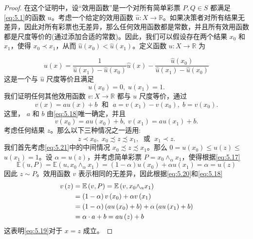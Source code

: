 \begin{proof}
在这个证明中，设“效用函数”是一个对所有简单彩票 \(P,Q \in  S\) 都满足\eqref{eq:5.1}的函数 \(u\)。考虑一个给定的效用函数 \(\widehat{u} : X \rightarrow  \mathbb{R}\)。如果决策者对所有结果无差异，因此对所有彩票也无差异，那么任何效用函数都是常数，并且所有效用函数都是尺度等价的(通过添加合适的常数)。因此，我们可以假设存在两个结果 \({x}_{0}\) 和 \({x}_{1}\)，使得 \({x}_{0} \prec  {x}_{1}\)，从而 \(\widehat{u}\left( {x}_{0}\right)  < \widehat{u}\left( {x}_{1}\right)\)。定义函数 \(u : X \rightarrow  \mathbb{R}\) 为

\[
u\left( x\right)  = \frac{1}{\widehat{u}\left( {x}_{1}\right)  - \widehat{u}\left( {x}_{0}\right) }\widehat{u}\left( x\right)  - \frac{\widehat{u}\left( {x}_{0}\right) }{\widehat{u}\left( {x}_{1}\right)  - \widehat{u}\left( {x}_{0}\right) }
\]
这是一个与 \(\widehat{u}\) 尺度等价且满足
\begin{equation}
\label{eq:5.18}
u\left( {x}_{0}\right)  = 0,\;u\left( {x}_{1}\right)  = 1.
\end{equation}
我们证明任何其他效用函数 \(v : X \rightarrow  \mathbb{R}\) 都与 \(u\) 尺度等价，通过
\begin{equation}
\label{eq:5.19}
v\left( x\right)  = {au}\left( x\right)  + b\;\text{ 和 }\;a = v\left( {x}_{1}\right)  - v\left( {x}_{0}\right) ,\;b = v\left( {x}_{0}\right) .
\end{equation}
这里， \(a\) 和 \(b\) 由\eqref{eq:5.18}唯一确定，并且
\begin{equation}
\label{eq:5.20}
v\left( {x}_{0}\right)  = {au}\left( {x}_{0}\right)  + b,\;v\left( {x}_{1}\right)  = {au}\left( {x}_{1}\right)  + b.
\end{equation}
考虑任何结果 \(z\)。那么以下三种情况之一适用:
\begin{equation}
\label{eq:5.21}
z \prec  {x}_{0},\;{x}_{0} \precsim  z \precsim  {x}_{1},\;\text{ 或 }\;{x}_{1} \prec  z.
\end{equation}
我们首先考虑\eqref{eq:5.21}中的中间情况 \({x}_{0} \precsim  z \precsim  {x}_{1}\)。那么 \(0 = u\left( {x}_{0}\right)  \leq  u\left( z\right)  \leq\)  \(u\left( {x}_{1}\right)  = 1\)。设 \(\alpha  = u\left( z\right)\)，并考虑简单彩票 \(P = {x}_{0}{ \land  }_{\alpha }{x}_{1}\)，使得根据\eqref{eq:5.17}
\[
\mathbb{E}\left( {u,P}\right)  = \mathbb{E}\left( {u,{x}_{0}{ \land  }_{\alpha }{x}_{1}}\right)  = \left( {1 - \alpha }\right) u\left( {x}_{0}\right)  + {\alpha u}\left( {x}_{1}\right)  = \alpha  = u\left( z\right)
\]
因此 \(z \sim  P\)。效用函数 \(v\) 表示相同的无差异，因此根据\eqref{eq:5.20}和\eqref{eq:5.18}
\begin{align}
v\left( z\right)  &= \mathbb{E}\left( {v,P}\right)  = \mathbb{E}\left( {v,{x}_{0}{ \land  }_{\alpha }{x}_{1}}\right) \notag \\
&= \left( {1 - \alpha }\right) v\left( {x}_{0}\right)  + {\alpha v}\left( {x}_{1}\right) \notag \\
&= \left( {1 - \alpha }\right) \left( {{au}\left( {x}_{0}\right)  + b}\right)  + \alpha \left( {{au}\left( {x}_{1}\right)  + b}\right) \notag \\
&= \alpha  \cdot  a + b = {au}\left( z\right)  + b \notag
\end{align}
这表明\eqref{eq:5.19}对于 \(x = z\) 成立。


\end{proof}
